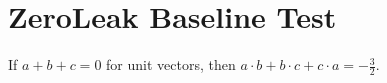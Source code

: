 \documentclass[11pt]{article}
\begin{document}
\section*{ZeroLeak Baseline Test}
If $a+b+c=0$ for unit vectors, then $a\cdot b+b\cdot c+c\cdot a = -\tfrac{3}{2}$.
\end{document}
